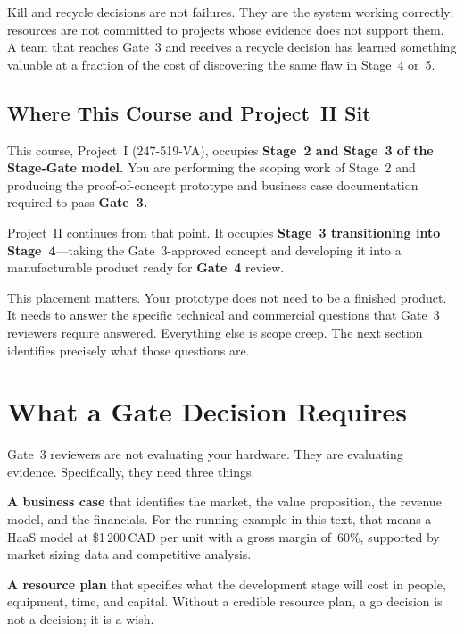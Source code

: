 Kill and recycle decisions are not failures.
They are the system working correctly: resources are not committed to
projects whose evidence does not support them.
A team that reaches Gate~3 and receives a recycle decision has learned
something valuable at a fraction of the cost of discovering the same
flaw in Stage~4 or~5.

\subsection{Where This Course and Project~II Sit}
\label{subsec:ch2-course-position}

This course, Project~I (247-519-VA), occupies \textbf{Stage~2 and
Stage~3 of the Stage-Gate model.}
You are performing the scoping work of Stage~2 and producing the
proof-of-concept prototype and business case documentation required to
pass \textbf{Gate~3.}

Project~II continues from that point.
It occupies \textbf{Stage~3 transitioning into Stage~4}---taking the
Gate~3-approved concept and developing it into a manufacturable product
ready for \textbf{Gate~4} review.

This placement matters.
Your prototype does not need to be a finished product.
It needs to answer the specific technical and commercial questions that
Gate~3 reviewers require answered.
Everything else is scope creep.
The next section identifies precisely what those questions are.

\section{What a Gate Decision Requires}
\label{sec:ch2-gate-requirements}

Gate~3 reviewers are not evaluating your hardware.
They are evaluating evidence.
Specifically, they need three things.

\textbf{A business case} that identifies the market, the value
proposition, the revenue model, and the financials.
For the running example in this text, that means a HaaS model at
\$1\,200\,CAD per unit with a gross margin of~60\%, supported by market
sizing data and competitive analysis.

\textbf{A resource plan} that specifies what the development stage will
cost in people, equipment, time, and capital.
Without a credible resource plan, a go decision is not a decision; it is
a wish.

